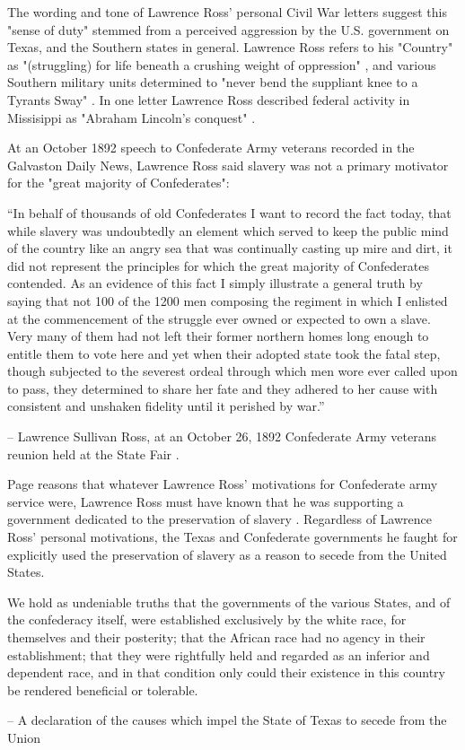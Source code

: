 \documentclass[12pt]{article}
\begin{document}
The wording and tone of Lawrence Ross' personal Civil War letters suggest this "sense of duty" stemmed from a perceived aggression by the U.S. government on Texas, and the Southern states in general. Lawrence Ross refers to his "Country" as "(struggling) for life beneath a crushing weight of oppression" \cite[pg. 28]{sullyletters}, and various Southern military units determined to "never bend the suppliant knee to a Tyrants Sway" \cite[pg. 17]{sullyletters}. In one letter Lawrence Ross described federal activity in Missisippi as "Abraham Lincoln's conquest" \cite[pg. 54]{sullyletters}.

At an October 1892 speech to Confederate Army veterans recorded in the Galvaston Daily News, Lawrence Ross said slavery was not a primary motivator for the "great majority of Confederates":
\begin{displayquote}
“In behalf of thousands of old Confederates I want to record the fact today, that while slavery was undoubtedly an element which served to keep the public mind of the country like an angry sea that was continually casting up mire and dirt, it did not represent the principles for which the great majority of Confederates contended.  As an evidence of this fact I simply illustrate a general truth by saying that not 100 of the 1200 men composing the regiment in which I enlisted at the commencement of the struggle ever owned or expected to own a slave.  Very many of them had not left their former northern homes long enough to entitle them to vote here and yet when their adopted state took the fatal step, though subjected to the severest ordeal through which men wore ever called upon to pass, they determined to share her fate and they adhered to her cause with consistent and unshaken fidelity until it perished by war.” 

-- Lawrence Sullivan Ross, at an October 26, 1892 Confederate Army veterans reunion held at the State Fair \cite{gdaily:1892-10-26}.
\end{displayquote}

Page reasons that whatever Lawrence Ross' motivations for Confederate army service were, Lawrence Ross must have known that he was supporting a government dedicated to the preservation of slavery \cite[pg. 59]{page}. Regardless of Lawrence Ross' personal motivations, the Texas and Confederate governments he faught for explicitly used the preservation of slavery as a reason to secede from the United States. 
\begin{displayquote}
We hold as undeniable truths that the governments of the various States, and of the confederacy itself, were established exclusively by the white race, for themselves and their posterity; that the African race had no agency in their establishment; that they were rightfully held and regarded as an inferior and dependent race, and in that condition only could their existence in this country be rendered beneficial or tolerable.

-- A declaration of the causes which impel the State of Texas to secede from the Union \cite{tx:secede}
\end{displayquote}
\end{document}
